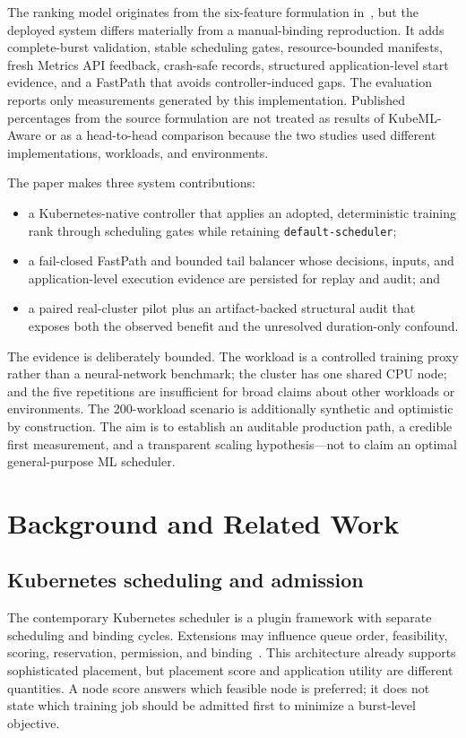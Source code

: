 \documentclass[10pt,journal,compsoc]{IEEEtran}
\newcommand{\system}{KubeML-Aware}
\begin{document}
The ranking model originates from the six-feature formulation in~\cite{abdelshaheed2025intelligent}, but the deployed system differs materially from a manual-binding reproduction. It adds complete-burst validation, stable scheduling gates, resource-bounded manifests, fresh Metrics API feedback, crash-safe records, structured application-level start evidence, and a FastPath that avoids controller-induced gaps. The evaluation reports only measurements generated by this implementation. Published percentages from the source formulation are not treated as results of \system{} or as a head-to-head comparison because the two studies used different implementations, workloads, and environments.

The paper makes three system contributions:
\begin{itemize}
  \item a Kubernetes-native controller that applies an adopted, deterministic training rank through scheduling gates while retaining \texttt{default-scheduler};
  \item a fail-closed FastPath and bounded tail balancer whose decisions, inputs, and application-level execution evidence are persisted for replay and audit; and
  \item a paired real-cluster pilot plus an artifact-backed structural audit that exposes both the observed benefit and the unresolved duration-only confound.
\end{itemize}

The evidence is deliberately bounded. The workload is a controlled training proxy rather than a neural-network benchmark; the cluster has one shared CPU node; and the five repetitions are insufficient for broad claims about other workloads or environments. The 200-workload scenario is additionally synthetic and optimistic by construction. The aim is to establish an auditable production path, a credible first measurement, and a transparent scaling hypothesis---not to claim an optimal general-purpose ML scheduler.

\section{Background and Related Work}

\subsection{Kubernetes scheduling and admission}

The contemporary Kubernetes scheduler is a plugin framework with separate scheduling and binding cycles. Extensions may influence queue order, feasibility, scoring, reservation, permission, and binding~\cite{kubernetesSchedulingFramework}. This architecture already supports sophisticated placement, but placement score and application utility are different quantities. A node score answers which feasible node is preferred; it does not state which training job should be admitted first to minimize a burst-level objective.
\end{document}
